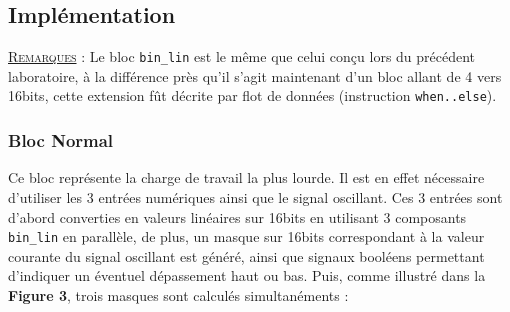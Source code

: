 \subsection{Implémentation}
\textsc{\underline{Remarques} :} Le bloc \texttt{bin\_lin} est le même que celui conçu lors du précédent laboratoire, à la différence près qu'il s'agit maintenant d'un bloc allant de 4 vers 16bits, cette extension fût décrite par flot de données (instruction \texttt{when..else}). \\
\subsubsection{Bloc Normal}
Ce bloc représente la charge de travail la plus lourde. Il est en effet nécessaire d'utiliser les 3 entrées numériques ainsi que le signal oscillant. Ces 3 entrées sont d'abord converties en valeurs linéaires sur 16bits en utilisant 3 composants \texttt{bin\_lin} en parallèle, de plus, un masque sur 16bits correspondant à la valeur courante du signal oscillant est généré, ainsi que signaux booléens permettant d'indiquer un éventuel dépassement haut ou bas. Puis, comme illustré dans la \textbf{Figure 3}, trois masques sont calculés simultanéments : 
